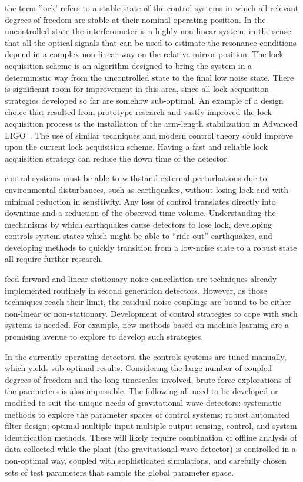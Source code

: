  the term 'lock' refers to a stable state of the control systems in which all relevant degrees of freedom are stable at their nominal operating position. In the uncontrolled state the interferometer is a highly non-linear system, in the sense that all the optical signals that can be used to estimate the resonance conditions depend in a complex non-linear way on the relative mirror position. The lock acquisition scheme is an algorithm designed to bring the system in a deterministic way from the uncontrolled state to the final low noise state. There is significant room for improvement in this area, since all lock acquisition strategies developed so far are somehow sub-optimal. An example of a design choice that resulted from prototype research and vastly improved the lock acquisition process is the installation of the arm-length stabilization in Advanced LIGO~\cite{Mullavey:12}. The use of similar techniques and modern control theory could improve upon the current lock acquisition scheme. Having a fast and reliable lock acquisition strategy can reduce the down time of the detector.\par
{} control systems must be able to withstand external perturbations due to environmental disturbances, such as earthquakes, without losing lock and with minimal reduction in sensitivity. Any loss of control translates directly into downtime and a reduction of the observed time-volume. Understanding the mechanisms by which earthquakes cause detectors to lose lock, developing controls system states which might be able to ``ride out'' earthquakes, and developing methods to quickly transition from a low-noise state to a robust state all require further research.\par
{} feed-forward and linear stationary noise cancellation are techniques already implemented routinely in second generation detectors. However, as those techniques reach their limit, the residual noise couplings are bound to be either non-linear or non-stationary. Development of control strategies to cope with such systems is needed. For example, new methods based on machine learning are a promising avenue to explore to develop such strategies.\par
{} In the currently operating detectors, the controls systems are tuned manually, which yields sub-optimal results.  Considering the large number of coupled degrees-of-freedom and the long timescales involved, brute force explorations of the parameters is also impossible. The following all need to be developed or modified to suit the unique needs of gravitational wave detectors: systematic methods to explore the parameter spaces of control systems; robust automated filter design; optimal multiple-input multiple-output sensing, control, and system identification methods. These will likely require combination of offline analysis of data collected while the plant (the gravitational wave detector) is controlled in a non-optimal way, coupled with sophisticated simulations, and carefully chosen sets of test parameters that sample the global parameter space.
